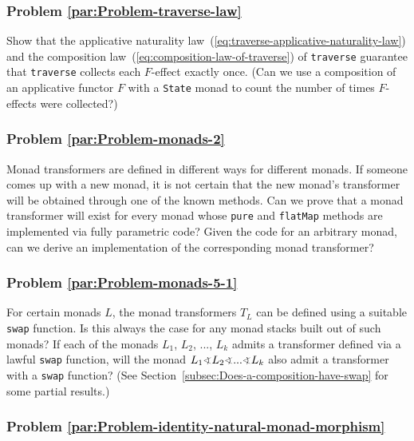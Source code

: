 \subsubsection{Problem \label{par:Problem-traverse-law}\ref{par:Problem-traverse-law}}

Show that the applicative naturality law~(\ref{eq:traverse-applicative-naturality-law})
and the composition law~(\ref{eq:composition-law-of-traverse}) of
\lstinline!traverse! guarantee that \lstinline!traverse! collects
each $F$-effect exactly once. (Can we use a composition of an applicative
functor $F$ with a \lstinline!State! monad to count the number of
times $F$-effects were collected?)

\subsubsection{Problem \label{par:Problem-monads-2}\ref{par:Problem-monads-2}}

Monad transformers are defined in different ways for different monads.
If someone comes up with a new monad, it is not certain that the new
monad\textsf{'}s transformer will be obtained through one of the known methods.
Can we prove that a monad transformer will exist for every monad whose
\lstinline!pure! and \lstinline!flatMap! methods are implemented
via fully parametric code? Given the code for an arbitrary monad,
can we derive an implementation of the corresponding monad transformer?

\subsubsection{Problem \label{par:Problem-monads-5-1}\ref{par:Problem-monads-5-1}}

For certain monads $L$, the monad transformers $T_{L}$ can be defined
using a suitable \lstinline!swap! function. Is this always the case
for any monad stacks built out of such monads? If each of the monads
$L_{1}$, $L_{2}$, ..., $L_{k}$ admits a transformer defined via
a lawful \lstinline!swap! function, will the monad $L_{1}\varangle L_{2}\varangle...\varangle L_{k}$
also admit a transformer with a \lstinline!swap! function? (See Section~\ref{subsec:Does-a-composition-have-swap}
for some partial results.)

\subsubsection{Problem \label{par:Problem-identity-natural-monad-morphism}\ref{par:Problem-identity-natural-monad-morphism}}

